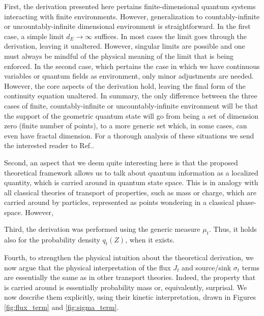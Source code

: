 \documentclass[%
 reprint,
 superscriptaddress,
 aps,
 pra,
]{revtex4-2}
\theoremstyle{definition}
\begin{document}
First, the derivation presented here pertains finite-dimensional quantum systems interacting with 
finite environments. However, generalization to countably-infinite or uncountably-infinite dimensional
environment is straightforward. In the first case, a simple limit $d_E \to \infty$ suffices. In most cases the limit 
goes through the derivation, leaving it unaltered. However, singular limits are possible and one must always be mindful
of the physical meaning of the limit that is being enforced. In the second case, which pertains the case in which we 
have continuous variables or quantum fields as environment, only minor adjustments are needed.
However, the core aspects of the derivation hold, leaving the final form of the continuity equation
unaltered. In summary, the only difference between the three cases of finite, countably-infinite or uncountably-infinite
environment will be that the support of the geometric quantum state will go from being a set of dimension zero (finite number
of points), to a more generic set which, in some cases, can even have fractal dimension. For a thorough analysis
of these situations we send the interested reader to Ref.\cite{Anza2022QuantumInformationDimension}.

Second, an aspect that we deem quite interesting here is that the proposed theoretical framework allows us to talk 
about quantum information as a localized quantity, which is carried around in quantum state space. This is in analogy 
with all classical theories of transport of properties, such as mass or charge, which are carried around by 
particles, represented as points wondering in a classical phase-space. However, 

Third, the derivation was performed using the generic measure $\mu_t$. Thus, it holds also for the probability
density $q_t(Z)$, when it exists.

Fourth, to strengthen the physical intuition about the theoretical derivation, we now argue that the physical interpretation 
of the flux $J_t$ and source/sink $\sigma_t$ terms are essentially the same as in other transport theories. Indeed, the 
property that is carried around is essentially probability mass or, equivalently, surprisal. We now describe them explicitly, using 
their kinetic interpretation, drawn in Figures \ref{fig:flux_term} and \ref{fig:sigma_term}. 
\end{document}
